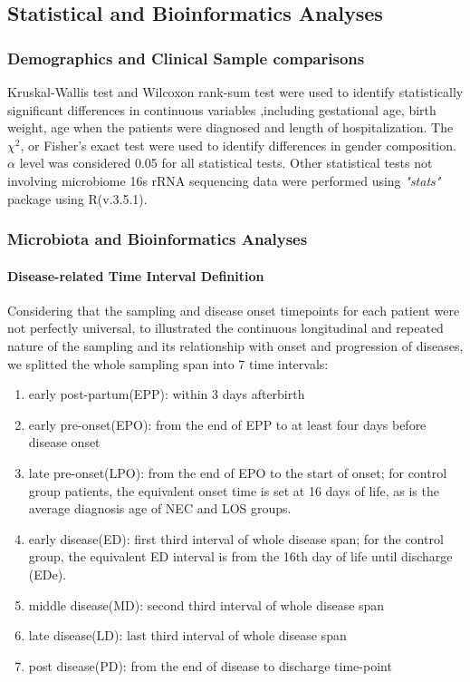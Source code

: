 \documentclass[fleqn,10pt]{wlpeerj} %
\begin{document}
  \subsection*{Statistical and Bioinformatics Analyses}
    \subsubsection*{Demographics and Clinical Sample comparisons}
    Kruskal-Wallis test and Wilcoxon rank-sum test were used to identify statistically significant differences in continuous variables ,including gestational age, birth weight, age when the patients were diagnosed and length of hospitalization. The $\chi^2$, or Fisher's exact test were used to identify differences in gender composition. $\alpha$ level was considered 0.05 for all statistical tests. Other statistical tests not involving microbiome 16s rRNA sequencing data were performed using \textit{"stats"} package using R(v.3.5.1).
    \subsubsection*{Microbiota and Bioinformatics Analyses}
      \paragraph*{Disease-related Time Interval Definition}
      Considering that the sampling and disease onset timepoints for each patient were not perfectly universal, to illustrated the continuous longitudinal and repeated nature of the sampling and its relationship with onset and progression of diseases, we splitted the whole sampling span into 7 time intervals:
        \begin{enumerate}[noitemsep]
          \item early post-partum(EPP): within 3 days afterbirth
          \item early pre-onset(EPO): from the end of EPP to at least four days before disease onset
          \item late pre-onset(LPO): from the end of EPO to the start of onset; for control group patients, the equivalent onset time is set at 16 days of life, as is the average diagnosis age of NEC and LOS groups.
          \item early disease(ED): first third interval of whole disease span; for the control group, the equivalent ED interval is from the 16th day of life until discharge (EDe).
          \item middle disease(MD): second third interval of whole disease span
          \item late disease(LD): last third interval of whole disease span
          \item post disease(PD): from the end of disease to discharge time-point
        \end{enumerate}
\end{document}
